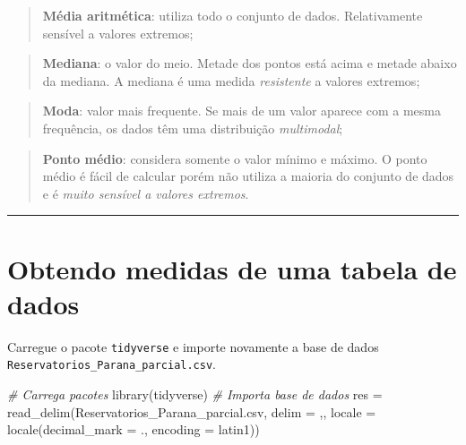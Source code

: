 \documentclass[
]{book}
\newenvironment{Shaded}{\begin{snugshade}}{\end{snugshade}}
\newcommand{\AttributeTok}[1]{\textcolor[rgb]{0.77,0.63,0.00}{#1}}
\newcommand{\CommentTok}[1]{\textcolor[rgb]{0.56,0.35,0.01}{\textit{#1}}}
\newcommand{\FunctionTok}[1]{\textcolor[rgb]{0.00,0.00,0.00}{#1}}
\newcommand{\NormalTok}[1]{#1}
\newcommand{\OtherTok}[1]{\textcolor[rgb]{0.56,0.35,0.01}{#1}}
\newcommand{\StringTok}[1]{\textcolor[rgb]{0.31,0.60,0.02}{#1}}
\begin{document}
\begin{quote}
\textbf{Média aritmética}: utiliza todo o conjunto de dados. Relativamente sensível a valores extremos;
\end{quote}

\begin{quote}
\textbf{Mediana}: o valor do meio. Metade dos pontos está acima e metade abaixo da mediana. A mediana é uma medida \emph{resistente} a valores extremos;
\end{quote}

\begin{quote}
\textbf{Moda}: valor mais frequente. Se mais de um valor aparece com a mesma frequência, os dados têm uma distribuição \emph{multimodal};
\end{quote}

\begin{quote}
\textbf{Ponto médio}: considera somente o valor mínimo e máximo. O ponto médio é fácil de calcular porém não utiliza a maioria do conjunto de dados e é \emph{muito sensível a valores extremos}.
\end{quote}

\begin{center}\rule{0.5\linewidth}{0.5pt}\end{center}

\hypertarget{obtendo-medidas-de-uma-tabela-de-dados}{%
\section{Obtendo medidas de uma tabela de dados}\label{obtendo-medidas-de-uma-tabela-de-dados}}

Carregue o pacote \texttt{tidyverse} e importe novamente a base de dados \texttt{Reservatorios\_Parana\_parcial.csv}.

\begin{Shaded}
\begin{Highlighting}[]
\CommentTok{\# Carrega pacotes}
\FunctionTok{library}\NormalTok{(tidyverse)}
\CommentTok{\# Importa base de dados }
\NormalTok{res }\OtherTok{=} \FunctionTok{read\_delim}\NormalTok{(}\StringTok{\textquotesingle{}Reservatorios\_Parana\_parcial.csv\textquotesingle{}}\NormalTok{,}
                  \AttributeTok{delim =} \StringTok{\textquotesingle{},\textquotesingle{}}\NormalTok{,}
                  \AttributeTok{locale =} \FunctionTok{locale}\NormalTok{(}\AttributeTok{decimal\_mark =} \StringTok{\textquotesingle{}.\textquotesingle{}}\NormalTok{,}
                                  \AttributeTok{encoding =} \StringTok{\textquotesingle{}latin1\textquotesingle{}}\NormalTok{))}
\end{Highlighting}
\end{Shaded}
\end{document}
